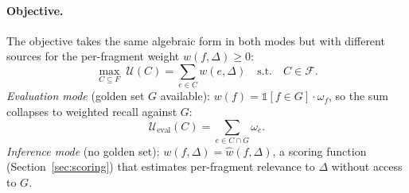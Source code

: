 \documentclass[11pt, a4paper]{article}
\providecommand{\mathbbm}[1]{\mathds{#1}}
\begin{document}
\begin{table}[h]
\centering
\small
\caption{Algorithm $\times$ constraint $\times$ guarantee map. The deployed default is a heuristic; analyzable variants of the framework admit the listed guarantees on their respective surrogate problems, and a submodular concept-coverage extension is described in Section~\ref{sec:utility} but is not the deployed default.}
\label{tab:algo-constraint-guarantee}
\end{table}

\paragraph{Objective.} The objective takes the same algebraic form in both modes but with different sources for the per-fragment weight $w(f, \Delta) \geq 0$:
\begin{equation}
\max_{C \subseteq F} \; \mathcal{U}(C) = \sum_{e \in C} w(e, \Delta) \quad \text{s.t.} \quad C \in \mathcal{F}.
\end{equation}
\emph{Evaluation mode} (golden set $G$ available): $w(f) = \mathbbm{1}[f \in G] \cdot \omega_f$, so the sum collapses to weighted recall against $G$:
\begin{equation}
\mathcal{U}_{\mathrm{eval}}(C) = \sum_{e \in C \cap G} \omega_e.
\end{equation}
\emph{Inference mode} (no golden set): $w(f, \Delta) = \hat{w}(f, \Delta)$, a scoring function (Section~\ref{sec:scoring}) that estimates per-fragment relevance to $\Delta$ without access to $G$.
\end{document}
